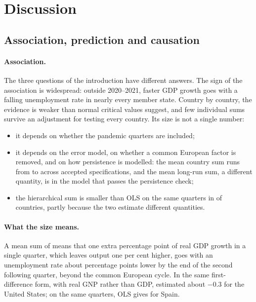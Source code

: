\section{Discussion}\label{sec:discussion}

\subsection{Association, prediction and causation}

\paragraph{Association.} The three questions of the introduction have different answers.
The sign of the association is widespread: outside 2020--2021, faster GDP growth goes with
a falling unemployment rate in nearly every member state. Country by country, the evidence
is weaker than normal critical values suggest, and few individual sums survive an
adjustment for testing every country. Its size is not a single number:
\begin{itemize}
  \item it depends on whether the pandemic quarters are included;
  \item it depends on the error model, on whether a common European factor is removed,
    and on how persistence is modelled: the mean country sum runs from  to
     across accepted specifications, and the mean long-run sum, a different
    quantity, is  in the model that
    passes the persistence check;
  \item the hierarchical sum is smaller than OLS on the same quarters in
     of  countries, partly because the two estimate
    different quantities.
\end{itemize}

\paragraph{What the size means.} A mean sum of  means that one extra percentage
point of real GDP growth in a single quarter, which leaves output one per cent higher, goes
with an unemployment rate about  percentage points lower by the end of the
second following quarter, beyond the common European cycle. In the same first-difference
form, with real GNP rather than GDP, \citet{okun1962} estimated about $-0.3$ for the
United States; on the same quarters,
OLS gives  for Spain.

